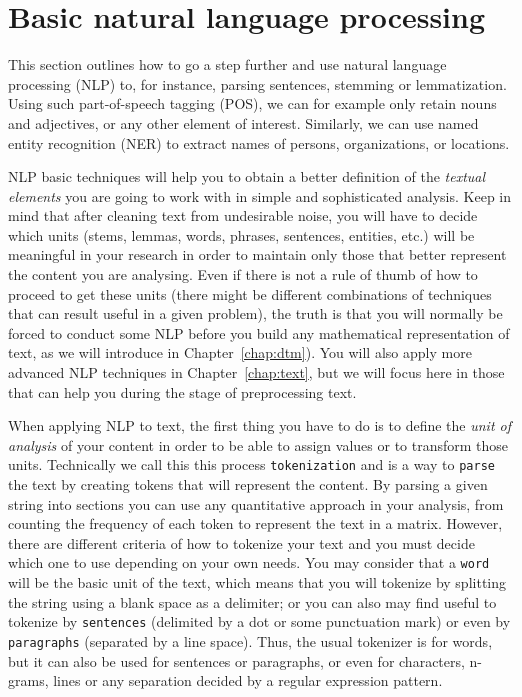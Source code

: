 \section{Basic natural language processing}
\label{sec:nlp}


This section outlines how to go a step further and use natural language processing (NLP) to, for instance, parsing sentences, stemming or lemmatization. Using such part-of-speech tagging (POS), we can for example only retain nouns and adjectives, or any other element of interest. Similarly, we can use named entity recognition (NER) to extract names of persons, organizations, or locations.

NLP basic techniques will help you to obtain a better definition of the \textit{textual elements} you are going to work with in simple and sophisticated analysis. Keep in mind that after cleaning text from undesirable noise, you will have to decide which units (stems, lemmas, words, phrases, sentences, entities, etc.) will be meaningful in your research in order to maintain only those that better represent the content you are analysing. Even if there is not a rule of thumb of how to proceed to get these units (there might be different combinations of techniques that can result useful in a given problem), the truth is that you will normally be forced to conduct some NLP before you build any mathematical representation of text, as we will introduce in Chapter~\ref{chap:dtm}). You will also apply more advanced NLP techniques in Chapter~\ref{chap:text}, but we will focus here in those that can help you during the stage of preprocessing text.

When applying NLP to text, the first thing you have to do is to define the \textit{unit of analysis} of your content in order to be able to assign values or to transform those units. Technically we call this this process \texttt{tokenization} and is a way to \texttt{parse} the text by creating tokens that will represent the content. By parsing a given string into sections you can use any quantitative approach in your analysis, from counting the frequency of each token to represent the text in a matrix. However, there are different criteria of how to tokenize your text and you must decide which one to use depending on your own needs. You may consider that a \texttt{word} will be the basic unit of the text, which means that you will tokenize by splitting the string using a blank space as a delimiter; or you can also may find useful to tokenize by \texttt{sentences} (delimited by a dot or some punctuation mark) or even by \texttt{paragraphs} (separated by a line space). Thus, the usual tokenizer is for words, but it can also be used for sentences or paragraphs, or even for characters, n-grams, lines or any separation decided by a regular expression pattern.

